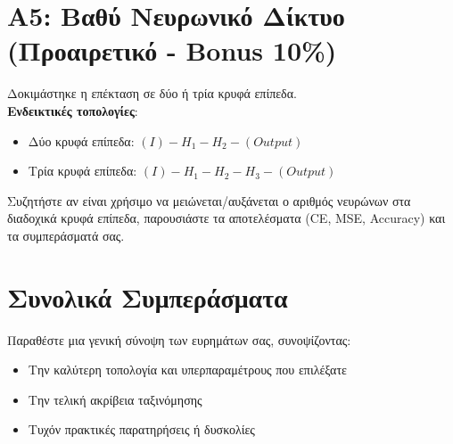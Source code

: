 \documentclass[a4paper,11pt]{article}
\begin{document}
\section{A5: Βαθύ Νευρωνικό Δίκτυο (Προαιρετικό - Bonus 10\%)}
Δοκιμάστηκε η επέκταση σε δύο ή τρία κρυφά επίπεδα. \\
\textbf{Ενδεικτικές τοπολογίες}: 
\begin{itemize}
    \item Δύο κρυφά επίπεδα: $(I) - H_1 - H_2 - (Output)$
    \item Τρία κρυφά επίπεδα: $(I) - H_1 - H_2 - H_3 - (Output)$
\end{itemize}
Συζητήστε αν είναι χρήσιμο να μειώνεται/αυξάνεται ο αριθμός νευρώνων στα διαδοχικά
κρυφά επίπεδα, παρουσιάστε τα αποτελέσματα (CE, MSE, Accuracy) και τα συμπεράσματά σας.

\section{Συνολικά Συμπεράσματα}
Παραθέστε μια γενική σύνοψη των ευρημάτων σας, συνοψίζοντας:
\begin{itemize}
    \item Την καλύτερη τοπολογία και υπερπαραμέτρους που επιλέξατε
    \item Την τελική ακρίβεια ταξινόμησης
    \item Τυχόν πρακτικές παρατηρήσεις ή δυσκολίες
\end{itemize}

\end{document}
